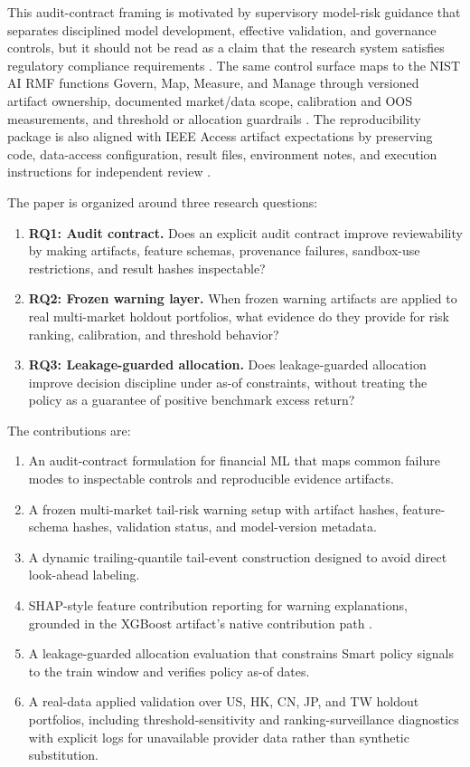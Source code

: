 \documentclass{ieeeaccess}
\begin{document}
This audit-contract framing is motivated by supervisory model-risk guidance that separates disciplined model development, effective validation, and governance controls, but it should not be read as a claim that the research system satisfies regulatory compliance requirements \cite{FederalReserveOCC2011SR117ModelRisk}. The same control surface maps to the NIST AI RMF functions Govern, Map, Measure, and Manage through versioned artifact ownership, documented market/data scope, calibration and OOS measurements, and threshold or allocation guardrails \cite{Tabassi2023NISTAIRMF}. The reproducibility package is also aligned with IEEE Access artifact expectations by preserving code, data-access configuration, result files, environment notes, and execution instructions for independent review \cite{IEEEAccessReproducibility2026}.

The paper is organized around three research questions:
\begin{enumerate}
\item \textbf{RQ1: Audit contract.} Does an explicit audit contract improve reviewability by making artifacts, feature schemas, provenance failures, sandbox-use restrictions, and result hashes inspectable?
\item \textbf{RQ2: Frozen warning layer.} When frozen warning artifacts are applied to real multi-market holdout portfolios, what evidence do they provide for risk ranking, calibration, and threshold behavior?
\item \textbf{RQ3: Leakage-guarded allocation.} Does leakage-guarded allocation improve decision discipline under as-of constraints, without treating the policy as a guarantee of positive benchmark excess return?
\end{enumerate}

The contributions are:
\begin{enumerate}
\item An audit-contract formulation for financial ML that maps common failure modes to inspectable controls and reproducible evidence artifacts.
\item A frozen multi-market tail-risk warning setup with artifact hashes, feature-schema hashes, validation status, and model-version metadata.
\item A dynamic trailing-quantile tail-event construction designed to avoid direct look-ahead labeling.
\item SHAP-style feature contribution reporting for warning explanations, grounded in the XGBoost artifact's native contribution path \cite{ChenGuestrin2016XGBoost,LundbergLee2017SHAP}.
\item A leakage-guarded allocation evaluation that constrains Smart policy signals to the train window and verifies policy as-of dates.
\item A real-data applied validation over US, HK, CN, JP, and TW holdout portfolios, including threshold-sensitivity and ranking-surveillance diagnostics with explicit logs for unavailable provider data rather than synthetic substitution.
\end{enumerate}
\end{document}
